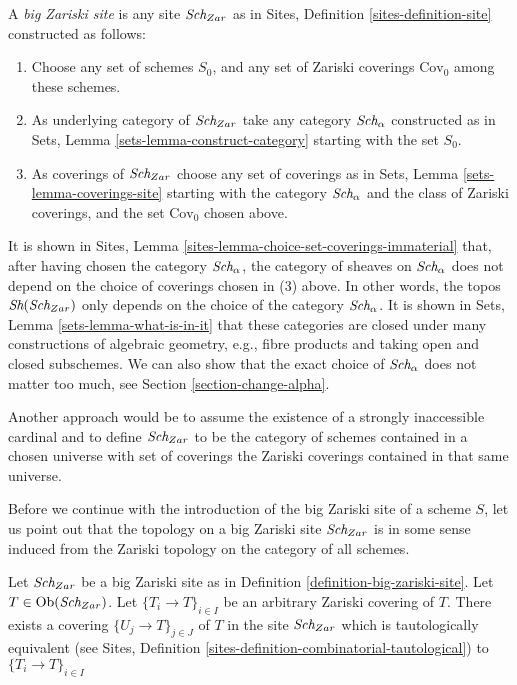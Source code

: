 \begin{definition}
\label{definition-big-zariski-site}
A {\it big Zariski site} is any site $\textit{Sch}_{Zar}$ as in
Sites, Definition \ref{sites-definition-site} constructed as follows:
\begin{enumerate}
\item Choose any set of schemes $S_0$, and any set of Zariski coverings
$\text{Cov}_0$ among these schemes.
\item As underlying category of $\textit{Sch}_{Zar}$
take any category $\textit{Sch}_\alpha$ constructed as in
Sets, Lemma \ref{sets-lemma-construct-category} starting with the set $S_0$.
\item As coverings of $\textit{Sch}_{Zar}$ choose any set of coverings as in
Sets, Lemma \ref{sets-lemma-coverings-site} starting with the
category $\textit{Sch}_\alpha$ and the class of Zariski coverings,
and the set $\text{Cov}_0$ chosen above.
\end{enumerate}
\end{definition}

\noindent
It is shown in Sites, Lemma \ref{sites-lemma-choice-set-coverings-immaterial}
that, after having chosen the category $\textit{Sch}_\alpha$, the
category of sheaves on $\textit{Sch}_\alpha$ does not depend on the
choice of coverings chosen in (3) above. In other words, the topos
$\mathop{\textit{Sh}}\nolimits(\textit{Sch}_{Zar})$ only depends on the choice of
the category $\textit{Sch}_\alpha$. It is shown in
Sets, Lemma \ref{sets-lemma-what-is-in-it} that these categories
are closed under many constructions of algebraic geometry, e.g.,
fibre products and taking open and closed subschemes. We can also show
that the exact choice of $\textit{Sch}_\alpha$ does not matter
too much, see Section \ref{section-change-alpha}.

\medskip\noindent
Another approach would be to assume the existence of a
strongly inaccessible cardinal and to define $\textit{Sch}_{Zar}$
to be the category of schemes contained in a chosen universe with
set of coverings the Zariski coverings contained in that same
universe.

\medskip\noindent
Before we continue with the introduction of the big Zariski site of
a scheme $S$, let us point out that the topology on a big Zariski site
$\textit{Sch}_{Zar}$ is in some sense induced from the Zariski topology
on the category of all schemes.

\begin{lemma}
\label{lemma-zariski-induced}
Let $\textit{Sch}_{Zar}$ be a big Zariski site as in
Definition \ref{definition-big-zariski-site}.
Let $T \in \mathop{\rm Ob}\nolimits(\textit{Sch}_{Zar})$.
Let $\{T_i \to T\}_{i \in I}$ be an arbitrary Zariski covering of $T$.
There exists a covering $\{U_j \to T\}_{j \in J}$ of $T$ in the site
$\textit{Sch}_{Zar}$ which is tautologically equivalent (see
Sites, Definition \ref{sites-definition-combinatorial-tautological})
to $\{T_i \to T\}_{i \in I}$
\end{lemma}

